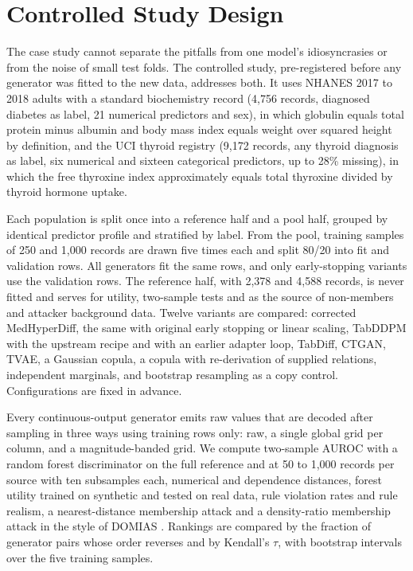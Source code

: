 \documentclass[conference]{IEEEtran}
\begin{document}
\section{Controlled Study Design}

The case study cannot separate the pitfalls from one model's idiosyncrasies or from the noise of small test folds. The controlled study, pre-registered before any generator was fitted to the new data, addresses both. It uses NHANES 2017 to 2018 \cite{nhanes} adults with a standard biochemistry record (4,756 records, diagnosed diabetes as label, 21 numerical predictors and sex), in which globulin equals total protein minus albumin and body mass index equals weight over squared height by definition, and the UCI thyroid registry (9,172 records, any thyroid diagnosis as label, six numerical and sixteen categorical predictors, up to 28\% missing), in which the free thyroxine index approximately equals total thyroxine divided by thyroid hormone uptake.

Each population is split once into a reference half and a pool half, grouped by identical predictor profile and stratified by label. From the pool, training samples of 250 and 1,000 records are drawn five times each and split 80/20 into fit and validation rows. All generators fit the same rows, and only early-stopping variants use the validation rows. The reference half, with 2,378 and 4,588 records, is never fitted and serves for utility, two-sample tests and as the source of non-members and attacker background data. Twelve variants are compared: corrected MedHyperDiff, the same with original early stopping or linear scaling, TabDDPM with the upstream recipe and with an earlier adapter loop, TabDiff, CTGAN, TVAE, a Gaussian copula, a copula with re-derivation of supplied relations, independent marginals, and bootstrap resampling as a copy control. Configurations are fixed in advance.

Every continuous-output generator emits raw values that are decoded after sampling in three ways using training rows only: raw, a single global grid per column, and a magnitude-banded grid. We compute two-sample AUROC with a random forest discriminator on the full reference and at 50 to 1,000 records per source with ten subsamples each, numerical and dependence distances, forest utility trained on synthetic and tested on real data, rule violation rates and rule realism, a nearest-distance membership attack and a density-ratio membership attack in the style of DOMIAS \cite{vanbreugel2023domias}. Rankings are compared by the fraction of generator pairs whose order reverses and by Kendall's $\tau$, with bootstrap intervals over the five training samples.
\end{document}
